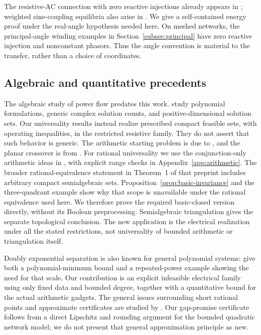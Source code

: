 The resistive-AC connection with zero reactive injections already appears in
\citet[Appendix B, Case 2]{LavaeiLow2012}; weighted sine-coupling equilibria
also arise in \citet{DorflerEtAl2013}. We give a self-contained energy proof
under the real-angle hypothesis needed here. On meshed networks, the
principal-angle winding examples in Section~\ref{subsec:principal} have
zero reactive injection and nonconstant phasors. Thus the angle convention
is material to the transfer, rather than a choice of coordinates.

\subsection{Algebraic and quantitative precedents}

The algebraic study of power flow predates this work.
\citet{MarecekEtAl2016} study polynomial formulations, generic complex
solution counts, and positive-dimensional solution sets. Our universality
results instead realize prescribed compact feasible sets, with operating
inequalities, in the restricted resistive family. They do not assert that
such behavior is generic. The arithmetic starting problem is due to
\citet{AbrahamsenEtAl2018,AbrahamsenEtAl2022}, and the planar crossover is
from \citet{DobbinsEtAl2023}. For rational universality we use the
conjunction-only arithmetic ideas in \citet{AbrahamsenMiltzow2019}, with
explicit range checks in Appendix~\ref{app:arithmetic}. The broader
rational-equivalence statement in Theorem~1 of that preprint includes
arbitrary compact semialgebraic sets. Proposition~\ref{prop:basic-invariance}
and the three-quadrant example show why that scope is unavailable under
the rational equivalence used here. We therefore prove the required
basic-closed version directly, without its Boolean preprocessing.
Semialgebraic triangulation \citep{OhmotoShiota2017} gives the separate
topological conclusion. The new application is the electrical realization
under all the stated restrictions, not universality of bounded arithmetic
or triangulation itself.

Doubly exponential separation is also known for general polynomial systems:
\citet{JeronimoEtAl2013} give both a polynomial-minimum bound and a
repeated-power example showing the need for that scale. Our contribution
is an explicit infeasible electrical family using only fixed data and
bounded degree, together with a quantitative bound for the actual
arithmetic gadgets. The general issues surrounding short rational points
and approximate certificates are studied by
\citet{BienstockDelPiaHildebrand2023}. Our gap-promise certificate follows
from a direct Lipschitz and rounding argument for the bounded quadratic
network model; we do not present that general approximation principle as
new.

